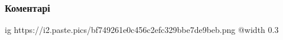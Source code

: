  
 
 
 
 
\subsubsection{Коментарі}

\begin{itemize} %

\ifcmt
  ig https://i2.paste.pics/bf749261e0c456c2efc329bbe7de9beb.png
  @width 0.3
\fi

\end{itemize} %
